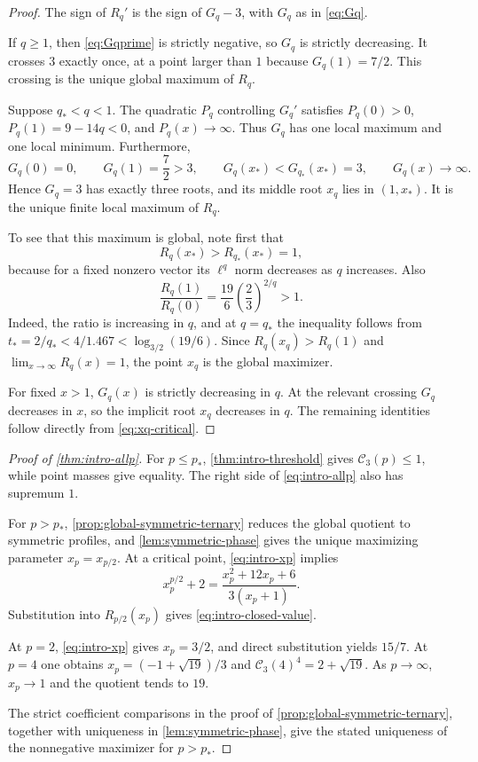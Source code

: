 \documentclass[11pt,reqno]{amsart}
\numberwithin{equation}{section}
\theoremstyle{definition}
\theoremstyle{remark}
\newcommand{\cC}{\mathcal C}
\begin{document}
\begin{proof}
The sign of $R_q'$ is the sign of $G_q-3$, with $G_q$ as in
\eqref{eq:Gq}.

If $q\ge1$, then \eqref{eq:Gqprime} is strictly negative, so $G_q$ is
strictly decreasing.  It crosses $3$ exactly once, at a point larger than
$1$ because $G_q(1)=7/2$.  This crossing is the unique global maximum of
$R_q$.

Suppose $q_*<q<1$.  The quadratic $P_q$ controlling $G_q'$ satisfies
$P_q(0)>0$, $P_q(1)=9-14q<0$, and $P_q(x)\to\infty$.  Thus $G_q$ has one
local maximum and one local minimum.  Furthermore,
\[
  G_q(0)=0,
  \qquad G_q(1)=\frac72>3,
  \qquad G_q(x_*)<G_{q_*}(x_*)=3,
  \qquad G_q(x)\to\infty.
\]
Hence $G_q=3$ has exactly three roots, and its middle root $x_q$ lies in
$(1,x_*)$.  It is the unique finite local maximum of $R_q$.

To see that this maximum is global, note first that
\[
  R_q(x_*)>R_{q_*}(x_*)=1,
\]
because for a fixed nonzero vector its $\ell^q$ norm decreases as $q$
increases.  Also
\[
  \frac{R_q(1)}{R_q(0)}
  =\frac{19}{6}\left(\frac23\right)^{2/q}>1.
\]
Indeed, the ratio is increasing in $q$, and at $q=q_*$ the inequality follows
from $t_*=2/q_*<4/1.467<\log_{3/2}(19/6)$.
Since $R_q(x_q)>R_q(1)$ and $\lim_{x\to\infty}R_q(x)=1$, the point $x_q$
is the global maximizer.

For fixed $x>1$, $G_q(x)$ is strictly decreasing in $q$.  At the relevant
crossing $G_q$ decreases in $x$, so the implicit root $x_q$ decreases in
$q$.  The remaining identities follow directly from
\eqref{eq:xq-critical}.
\end{proof}

\begin{proof}[Proof of \cref{thm:intro-allp}]
For $p\le p_*$, \cref{thm:intro-threshold} gives
$\cC_3(p)\le1$, while point masses give equality.  The right side of
\eqref{eq:intro-allp} also has supremum $1$.

For $p>p_*$, \cref{prop:global-symmetric-ternary} reduces the global
quotient to symmetric profiles, and \cref{lem:symmetric-phase} gives the
unique maximizing parameter $x_p=x_{p/2}$.  At a critical point,
\eqref{eq:intro-xp} implies
\begin{equation}\label{eq:xp-denom}
  x_p^{p/2}+2
  =\frac{x_p^2+12x_p+6}{3(x_p+1)}.
\end{equation}
Substitution into $R_{p/2}(x_p)$ gives
\eqref{eq:intro-closed-value}.

At $p=2$, \eqref{eq:intro-xp} gives $x_p=3/2$, and direct substitution
yields $15/7$.  At $p=4$ one obtains
$x_p=(-1+\sqrt{19})/3$ and $\cC_3(4)^4=2+\sqrt{19}$.  As $p\to\infty$,
$x_p\to1$ and the quotient tends to $19$.

The strict coefficient comparisons in the proof of
\cref{prop:global-symmetric-ternary}, together with uniqueness in
\cref{lem:symmetric-phase}, give the stated uniqueness of the nonnegative
maximizer for $p>p_*$.
\end{proof}
\end{document}
